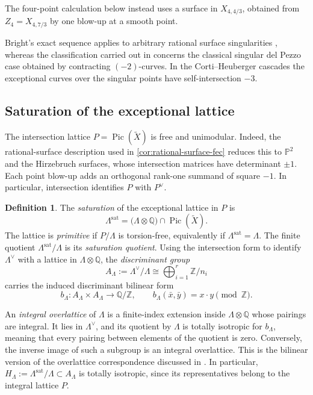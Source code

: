 \documentclass[11pt]{article}
\theoremstyle{plain}
\theoremstyle{definition}
\newtheorem{definition}[definition]{Definition}
\theoremstyle{remark}
\newcommand{\Pp}{\mathbb P}
\newcommand{\Z}{\mathbb Z}
\newcommand{\Pic}{\operatorname{Pic}}
\begin{document}
The four-point calculation below instead uses a surface in \(X_{4,4/3}\),
obtained from \(Z_4=X_{4,7/3}\) by one blow-up at a smooth point.

Bright's exact sequence applies to arbitrary rational surface singularities
\cite[Proposition~1]{Bright2013}, whereas the classification carried out in
\cite[Section~3]{Bright2013} concerns the classical singular del Pezzo case
obtained by contracting \((-2)\)-curves. In the Corti--Heuberger cascades the
exceptional curves over the singular points have self-intersection \(-3\).

\subsection{Saturation of the exceptional lattice}
\label{app:brauer-glue}

The intersection lattice \(P=\Pic(\widetilde X)\) is free and unimodular.
Indeed, the rational-surface description used in
\cref{cor:rational-surface-fec} reduces this to \(\Pp^2\) and the
Hirzebruch surfaces, whose intersection matrices have determinant \(\pm1\).
Each point blow-up adds an orthogonal rank-one summand of square \(-1\).
In particular, intersection identifies \(P\) with \(P^\vee\).

\begin{definition}\label{def:brauer-glue}
The \emph{saturation} of the exceptional lattice in \(P\) is
\[
\Lambda^{\mathrm{sat}}
=
\bigl(\Lambda\otimes\mathbb Q\bigr)\cap\Pic(\widetilde X).
\]
The lattice is \emph{primitive} if \(P/\Lambda\) is torsion-free,
equivalently if \(\Lambda^{\mathrm{sat}}=\Lambda\). The finite quotient
\(\Lambda^{\mathrm{sat}}/\Lambda\) is its \emph{saturation quotient}.
Using the intersection form to identify \(\Lambda^\vee\) with a lattice
in \(\Lambda\otimes\mathbb Q\), the \emph{discriminant group}
\[
A_\Lambda:=\Lambda^\vee/\Lambda\cong\bigoplus_{i=1}^r\Z/n_i
\]
carries the induced discriminant bilinear form
\[
b_\Lambda:A_\Lambda\times A_\Lambda\longrightarrow\mathbb Q/\Z,
\qquad
b_\Lambda(\bar x,\bar y)=x\cdot y\pmod\Z.
\]
\end{definition}

An \emph{integral overlattice} of \(\Lambda\) is a finite-index extension
inside \(\Lambda\otimes\mathbb Q\) whose pairings are integral. It lies
in \(\Lambda^\vee\), and its quotient by \(\Lambda\) is totally
isotropic for \(b_\Lambda\), meaning that every pairing between elements
of the quotient is zero. Conversely, the inverse image of such a subgroup
is an integral overlattice. This is the bilinear version of the
overlattice correspondence discussed in \cite[Section~1.4]{Nikulin1980}.
In particular, \(H_\Lambda:=\Lambda^{\mathrm{sat}}/\Lambda\subset A_\Lambda\) is totally isotropic,
since its representatives belong to the integral lattice \(P\).
\end{document}
